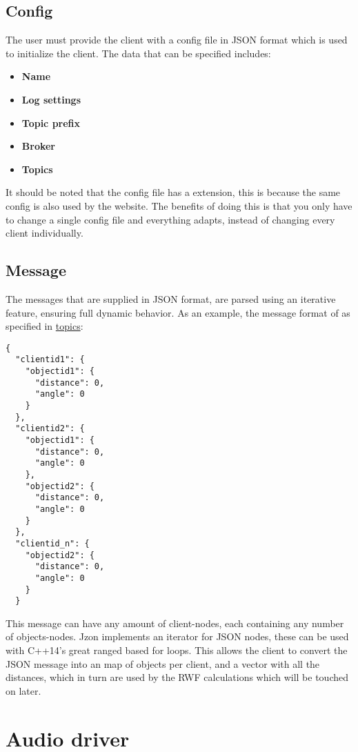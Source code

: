 \subsection{Config}
The user must provide the client with a config file in JSON format which is used to initialize the client. The data that can be specified includes:
\small{
\begin{itemize} [noitemsep, nolistsep]
	\item \textbf {Name}
	\item \textbf {Log settings}
	\item \textbf {Topic prefix}
	\item \textbf {Broker}
	\item \textbf {Topics\\}
\end{itemize}
}
It should be noted that the config file has a  extension, this is because the same config is also used by the website. The benefits of doing this is that you only have to change a single config file and everything adapts, instead of changing every client individually.

\subsection{Message}
The messages that are supplied in JSON format, are parsed using an iterative feature, ensuring full dynamic behavior. As an example, the message format of  as specified in \hyperref[chap:Topics]{topics}:
\begin{lstlisting}
{
  "clientid1": {
    "objectid1": {
      "distance": 0,
      "angle": 0
    }
  },
  "clientid2": {
    "objectid1": {
      "distance": 0,
      "angle": 0
    },
    "objectid2": {
      "distance": 0,
      "angle": 0
    }
  },
  "clientid_n": {
    "objectid2": {
      "distance": 0,
      "angle": 0
    }
  }
\end{lstlisting}

This message can have any amount  of client-nodes, each containing any number  of objects-nodes. Jzon implements an iterator for JSON nodes, these can be used with C++14's great ranged based for loops. This allows the client to convert the JSON message into an map of objects per client, and a vector with all the distances, which in turn are used by the RWF calculations which will be touched on later.

\section{Audio driver}
\label{sec:client_audio_driver}

